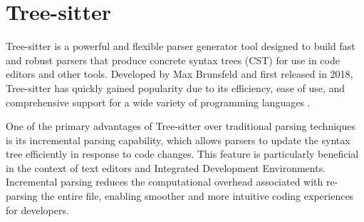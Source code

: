 \section{Tree-sitter}

Tree-sitter is a powerful and flexible parser generator tool designed to build
fast and robust parsers that produce concrete syntax trees (CST) for use in code
editors and other tools. Developed by Max Brunsfeld and first released in 2018,
Tree-sitter has quickly gained popularity due to its efficiency, ease of use,
and comprehensive support for a wide variety of programming languages
\cite{tree-sitter}. 

One of the primary advantages of Tree-sitter over traditional parsing techniques
is its incremental parsing capability, which allows parsers to update the syntax
tree efficiently in response to code changes. This feature is particularly
beneficial in the context of text editors and Integrated Development
Environments. Incremental parsing reduces the computational overhead
associated with re-parsing the entire file, enabling smoother and more
intuitive coding experiences for developers.
